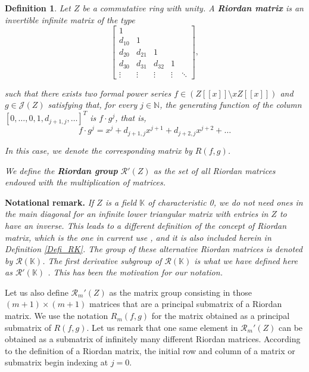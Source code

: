 \documentclass[preprint,12pt]{elsarticle}
\newtheorem{defi}{Definition}
\begin{document}
\begin{defi}
    Let $Z$ be a commutative ring with unity. A \textbf{Riordan matrix}  is an  invertible infinite matrix of the type
$$\begin{bmatrix} 1\\ d_{10} & 1\\ d_{20} & d_{21} & 1 \\ d_{30} & d_{31} & d_{32} & 1 \\ \vdots & \vdots & \vdots & \vdots & \ddots \end{bmatrix},$$

\noindent  such that there exists two formal power series $f\in (Z[[x]]\setminus xZ[[x]])$ and $g\in\mathcal J(Z)$ satisfying that, for every $j\in\mathbb N$, the generating function of the column $[0, \dots, 0,1,d_{j+1,j},\ldots]^T$ is $f\cdot g^j$, that is,
$$f\cdot g^j=x^j+d_{j+1,j}x^{j+1}+d_{j+2,j}x^{j+2}+\ldots$$

\noindent In this case, we denote the corresponding matrix by $R(f,g)$. \medskip 

We define the \textbf{Riordan group} $\mathcal R'(Z)$ as the set of all Riordan matrices endowed with the multiplication of matrices.
\end{defi}


\medskip

\noindent \textbf{Notational remark.} \emph{If $Z$ is a field $\mathbb K$ of characteristic 0, we do not need ones in the main diagonal for an infinite lower triangular matrix with entries in $Z$ to have an inverse. This leads to a different definition of the concept of Riordan matrix, which is the one in current use \cite{CK, CJKS, CPT, LMP, LMP2, LMP3}, and it is also included herein in Definition \ref{Defi_RK}. The group of these alternative Riordan matrices is denoted by $\mathcal R(\mathbb K)$. The first derivative subgroup of $\mathcal R(\mathbb K)$ is what we have defined here as $\mathcal R'(\mathbb K)$ \cite{LMP}. This has been the motivation for our notation.} 










\medskip

Let us also define $\mathcal R_m'(Z)$  as the matrix group consisting in those $(m+1)\times(m+1)$ matrices that are a principal submatrix of a Riordan matrix. We use the notation $R_m(f,g)$ for the matrix obtained as a principal submatrix of $R(f,g)$. Let us remark that one same element in $\mathcal R_m'(Z)$ can be obtained as a submatrix of infinitely many different Riordan matrices. According to the definition of a Riordan matrix, the initial row and column of a matrix or submatrix begin indexing at $j = 0$.
\end{document}
